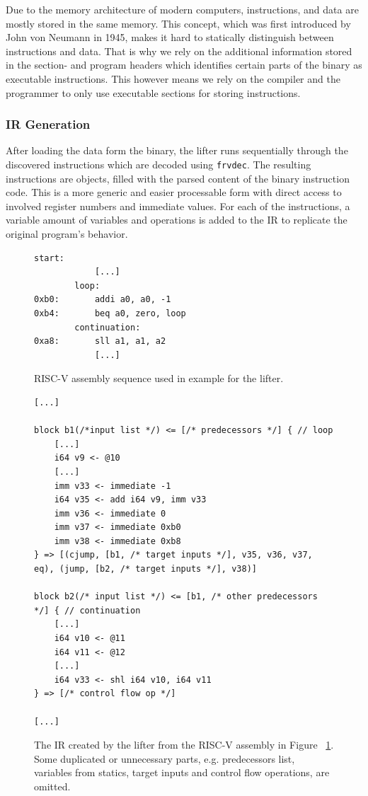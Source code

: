 \documentclass[course=eragp]{aspdoc}
\begin{document}
Due to the memory architecture of modern computers, instructions, and data are mostly stored in the same
memory. This concept, which was first introduced by John von Neumann in 1945\cite{vna}, makes it
hard to statically distinguish between instructions and data. That is why we rely on the additional
information stored in the section- and program headers which identifies certain parts of the binary
as executable instructions. This however means we rely on the compiler and the programmer to only
use executable sections for storing instructions.

\subsubsection{IR Generation}

After loading the data form the binary, the lifter runs sequentially through the discovered
instructions which are decoded using \texttt{frvdec}\cite{frvdec}. The resulting instructions are objects,
filled with the parsed content of the binary instruction code. This is a
more generic and easier processable form with direct access to involved register numbers and
immediate values. For each of the instructions, a variable amount of variables and operations is added to
the IR to replicate the original program's behavior.


\begin{figure}[H]
    \centering
    \begin{lstlisting}[language={[RISC-V]Assembler}]
        start:
            [...]
        loop:
0xb0:       addi a0, a0, -1
0xb4:       beq a0, zero, loop
        continuation:
0xa8:       sll a1, a1, a2
            [...]
    \end{lstlisting}
    \caption{RISC-V assembly sequence used in example for the lifter. }
    \label{fig:lifting_example_riscv}
\end{figure}

\begin{figure}[H]
    \centering
    \begin{lstlisting}
[...]

block b1(/*input list */) <= [/* predecessors */] { // loop
    [...]
    i64 v9 <- @10
    [...]
    imm v33 <- immediate -1
    i64 v35 <- add i64 v9, imm v33
    imm v36 <- immediate 0
    imm v37 <- immediate 0xb0
    imm v38 <- immediate 0xb8
} => [(cjump, [b1, /* target inputs */], v35, v36, v37, eq), (jump, [b2, /* target inputs */], v38)]

block b2(/* input list */) <= [b1, /* other predecessors */] { // continuation
    [...]
    i64 v10 <- @11
    i64 v11 <- @12
    [...]
    i64 v33 <- shl i64 v10, i64 v11
} => [/* control flow op */]

[...]
    \end{lstlisting}
    \caption{The IR created by the lifter from the RISC-V assembly in Figure
        ~\ref{fig:lifting_example_riscv}. \\
        Some duplicated or unnecessary parts, e.g. predecessors list, variables from statics, target
        inputs and control flow operations, are omitted.}
    \label{fig:lifting_example_ir}
\end{figure}
\end{document}
